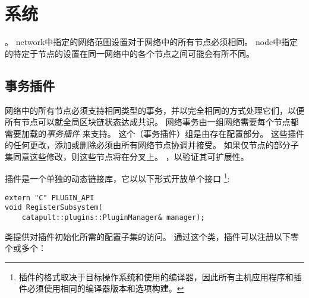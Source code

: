 \section{系统}
\label{sec:system}

\nemquote{
}{}


。
 {network}中指定的网络范围设置对于网络中的所有节点必须相同。
 {node}中指定的特定于节点的设置在同一网络中的各个节点之间可能会有所不同。

\subsection{事务插件}


网络中的所有节点必须支持相同类型的事务，并以完全相同的方式处理它们，以便所有节点可以就全局区块链状态达成共识。
网络事务由一组网络需要每个节点都需要加载的\textit{事务插件} 来支持。
这个（事务插件）组是由存在配置部分。
这些插件的任何更改，添加或删除必须由所有网络节点协调并接受。
如果仅节点的部分子集同意这些修改，则这些节点将在分叉上。
，以验证其可扩展性。

插件是一个单独的动态链接库，它以以下形式开放单个接口
\footnote{插件的格式取决于目标操作系统和使用的编译器，因此所有主机应用程序和插件必须使用相同的编译器版本和选项构建。}:

\begin{lstlisting}
extern "C" PLUGIN_API
void RegisterSubsystem(
	catapult::plugins::PluginManager& manager);
\end{lstlisting}

 类提供对插件初始化所需的配置子集的访问。
通过这个类，插件可以注册以下零个或多个：


